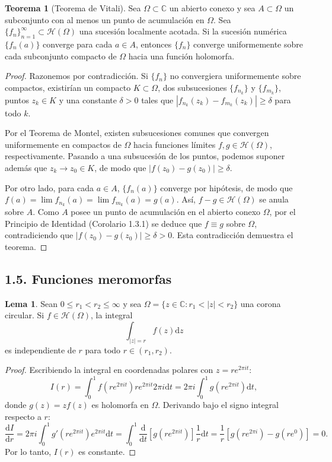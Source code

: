 \documentclass[11pt,a4paper]{article}
\theoremstyle{definition}
\newtheorem{teorema}{Teorema}[section]
\newtheorem{lema}{Lema}[section]
\theoremstyle{remark}
\numberwithin{equation}{section}
\newcommand{\dz}{\mathrm{d}z}
\newcommand{\dt}{\mathrm{d}t}
\begin{document}
\begin{teorema}[Teorema de Vitali]
Sea $\Omega \subset \mathbb{C}$ un abierto conexo y sea $A \subset \Omega$ un subconjunto con al menos un punto de acumulación en $\Omega$. Sea $\{f_n\}_{n=1}^\infty \subset \mathcal{H}(\Omega)$ una sucesión localmente acotada. Si la sucesión numérica $\{f_n(a)\}$ converge para cada $a \in A$, entonces $\{f_n\}$ converge uniformemente sobre cada subconjunto compacto de $\Omega$ hacia una función holomorfa.
\end{teorema}
\begin{proof}
Razonemos por contradicción. Si $\{f_n\}$ no convergiera uniformemente sobre compactos, existirían un compacto $K \subset \Omega$, dos subsucesiones $\{f_{n_k}\}$ y $\{f_{m_k}\}$, puntos $z_k \in K$ y una constante $\delta > 0$ tales que $|f_{n_k}(z_k) - f_{m_k}(z_k)| \ge \delta$ para todo $k$.

Por el Teorema de Montel, existen subsucesiones comunes que convergen uniformemente en compactos de $\Omega$ hacia funciones límites $f, g \in \mathcal{H}(\Omega)$, respectivamente. Pasando a una subsucesión de los puntos, podemos suponer además que $z_k \to z_0 \in K$, de modo que $|f(z_0) - g(z_0)| \ge \delta$.

Por otro lado, para cada $a \in A$, $\{f_n(a)\}$ converge por hipótesis, de modo que $f(a) = \lim f_{n_k}(a) = \lim f_{m_k}(a) = g(a)$. Así, $f - g \in \mathcal{H}(\Omega)$ se anula sobre $A$. Como $A$ posee un punto de acumulación en el abierto conexo $\Omega$, por el Principio de Identidad (Corolario 1.3.1) se deduce que $f \equiv g$ sobre $\Omega$, contradiciendo que $|f(z_0) - g(z_0)| \ge \delta > 0$. Esta contradicción demuestra el teorema.
\end{proof}

\subsection{1.5. Funciones meromorfas}

\begin{lema}
Sean $0 \le r_1 < r_2 \le \infty$ y sea $\Omega = \{z \in \mathbb{C} : r_1 < |z| < r_2\}$ una corona circular. Si $f \in \mathcal{H}(\Omega)$, la integral
\begin{equation}
\int_{|z|=r} f(z) \dz
\end{equation}
es independiente de $r$ para todo $r \in (r_1, r_2)$.
\end{lema}
\begin{proof}
Escribiendo la integral en coordenadas polares con $z = re^{2\pi i t}$:
\[
I(r) = \int_0^1 f(re^{2\pi i t}) r e^{2\pi i t} 2\pi i \dt = 2\pi i \int_0^1 g(r e^{2\pi i t}) \dt,
\]
donde $g(z) = z f(z)$ es holomorfa en $\Omega$. Derivando bajo el signo integral respecto a $r$:
\[
\frac{\mathrm{d}I}{\mathrm{d}r} = 2\pi i \int_0^1 g'(re^{2\pi i t}) e^{2\pi i t} \dt = \int_0^1 \frac{\mathrm{d}}{\dt} [g(re^{2\pi i t})] \frac{1}{r} \dt = \frac{1}{r} [g(re^{2\pi i}) - g(re^0)] = 0.
\]
Por lo tanto, $I(r)$ es constante.
\end{proof}
\end{document}

